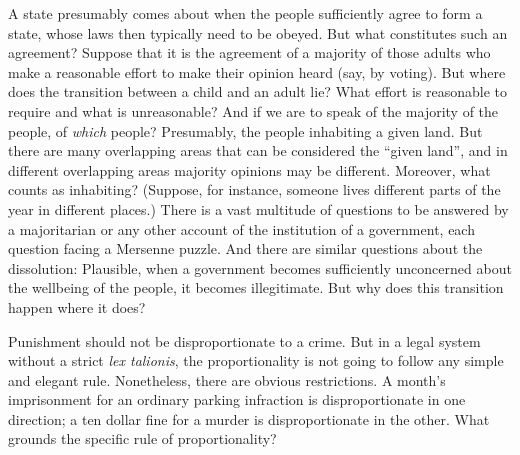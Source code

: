 A state presumably comes about when the people sufficiently agree to form a state, whose laws then typically need to be 
obeyed. But what constitutes such an agreement?
Suppose that it is the agreement of a majority of those adults who make a reasonable effort to make their opinion heard
(say, by voting). But where does the transition between a child and an adult lie? What effort is reasonable to require and
what is unreasonable? And if we are to speak of the majority of the people, of \textit{which} people? Presumably, the people
inhabiting a given land. But there are many overlapping areas that can be considered the ``given land'', and in different 
overlapping areas  majority opinions may be different. Moreover, what counts as inhabiting? (Suppose, for instance, someone 
lives different parts of the year in different places.) There is a vast multitude of questions to be answered by a
majoritarian or any other account of the institution of a government, each question facing a Mersenne puzzle. And
there are similar questions about the dissolution: Plausible, when a government becomes sufficiently unconcerned
about the wellbeing of the people, it becomes illegitimate. But why does this transition happen where it does? 

Punishment should not be disproportionate to a crime. But in a legal system without a strict \textit{lex talionis}, the
proportionality is not going to follow any simple and elegant rule. Nonetheless, there are obvious restrictions. 
A month's imprisonment for an ordinary parking infraction is disproportionate in one direction; a ten dollar fine
for a murder is disproportionate in the other. What grounds the specific rule of proportionality?

